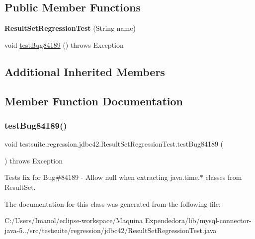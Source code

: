 \subsection*{Public Member Functions}
\begin{DoxyCompactItemize}
\item 
\mbox{\label{classtestsuite_1_1regression_1_1jdbc42_1_1_result_set_regression_test_afa5c8ccc98b024ce7e6768c68c9d0b30}} 
{\bfseries Result\+Set\+Regression\+Test} (String name)
\item 
void \mbox{\hyperlink{classtestsuite_1_1regression_1_1jdbc42_1_1_result_set_regression_test_abba04aa79419dbc6195b9e6e7d133dd6}{test\+Bug84189}} ()  throws Exception 
\end{DoxyCompactItemize}
\subsection*{Additional Inherited Members}


\subsection{Member Function Documentation}
\mbox{\label{classtestsuite_1_1regression_1_1jdbc42_1_1_result_set_regression_test_abba04aa79419dbc6195b9e6e7d133dd6}} 
\subsubsection{\texorpdfstring{test\+Bug84189()}{testBug84189()}}
{\footnotesize\ttfamily void testsuite.\+regression.\+jdbc42.\+Result\+Set\+Regression\+Test.\+test\+Bug84189 (\begin{DoxyParamCaption}{ }\end{DoxyParamCaption}) throws Exception}

Tests fix for Bug\#84189 -\/ Allow null when extracting java.\+time.$\ast$ classes from Result\+Set. 

The documentation for this class was generated from the following file\+:\begin{DoxyCompactItemize}
\item 
C\+:/\+Users/\+Imanol/eclipse-\/workspace/\+Maquina Expendedora/lib/mysql-\/connector-\/java-\/5../src/testsuite/regression/jdbc42/Result\+Set\+Regression\+Test.\+java\end{DoxyCompactItemize}

